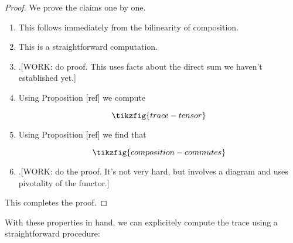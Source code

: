 \begin{proof} We prove the claims one by one.

\begin{enumerate}
\item This follows immediately from the bilinearity of composition.

\item This is a straightforward computation.

\item .[WORK: do proof. This uses facts about the direct sum we haven't established yet.]

\item Using Proposition [ref] we compute

\begin{equation*}
\tikzfig{trace-tensor}
\end{equation*}

\item Using Proposition [ref] we find that

\begin{equation*}
\tikzfig{composition-commutes}
\end{equation*}

\item .[WORK: do the proof. It's not very hard, but involves a diagram and uses pivotality of the functor.]

\end{enumerate}

This completes the proof.
\end{proof}

With these properties in hand, we can explicitely compute the trace using a straightforward procedure:


